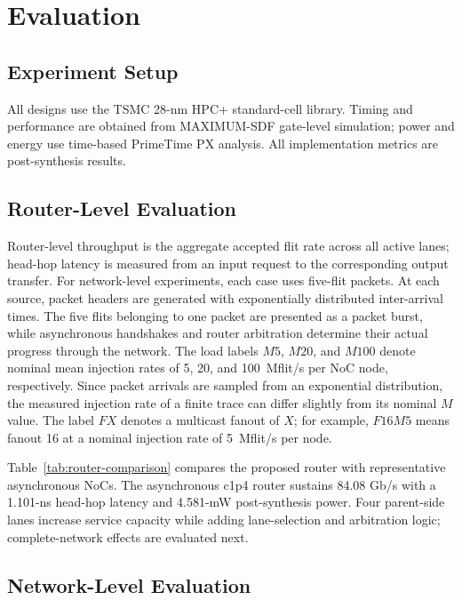 \documentclass[conference]{IEEEtran}
\begin{document}
\endgroup

\section{Evaluation}\label{sec:evaluation}

\subsection{Experiment Setup}\label{sec:setup}

All designs use the TSMC 28-nm HPC+ standard-cell library. Timing and performance are obtained from
MAXIMUM-SDF gate-level simulation; power and energy use time-based PrimeTime
PX analysis. All implementation metrics are post-synthesis results.

\subsection{Router-Level Evaluation}\label{sec:router-eval}

Router-level throughput is the aggregate accepted flit rate across all active
lanes; head-hop latency is measured from an input request to the corresponding
output transfer. For network-level experiments, each case uses five-flit packets. At each
source, packet headers are generated with exponentially distributed
inter-arrival times. The five flits belonging to one packet are presented as a
packet burst, while asynchronous handshakes and router arbitration determine
their actual progress through the network. The load labels \(M5\), \(M20\),
and \(M100\) denote nominal mean injection rates of 5, 20, and
100~Mflit/s per NoC node, respectively. Since packet arrivals are sampled
from an exponential distribution, the measured injection rate of a finite
trace can differ slightly from its nominal \(M\) value. The label \(F X\)
denotes a multicast fanout of \(X\); for example, \(F16M5\) means fanout 16
at a nominal injection rate of 5~Mflit/s per node.



Table~\ref{tab:router-comparison} compares the proposed router with
representative asynchronous NoCs. The asynchronous c1p4 router sustains 84.08 Gb/s with a
1.101-ns head-hop latency and 4.581-mW post-synthesis power. Four parent-side
lanes increase service capacity while adding lane-selection and arbitration
logic; complete-network effects are evaluated next.

\subsection{Network-Level Evaluation}\label{sec:network-eval}
\end{document}
